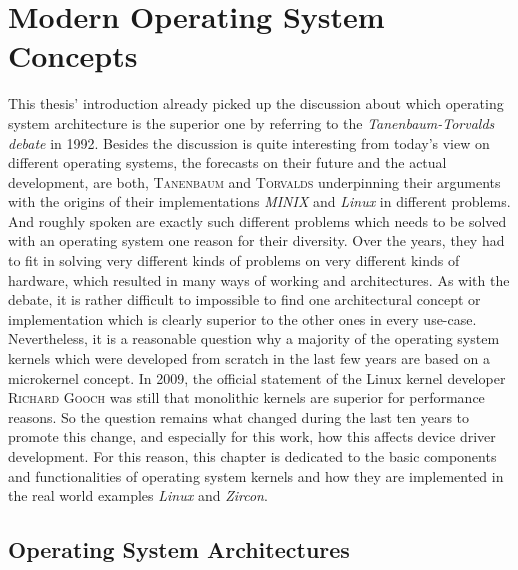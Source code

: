 
\chapter{Modern Operating System Concepts}\label{ch:modern-os-concepts}
This thesis' introduction already picked up the discussion about which operating system architecture is the superior one by referring to the \textit{Tanenbaum-Torvalds debate}\cite{linux-is-obsolete} in 1992.
Besides the discussion is quite interesting from today's view on different operating systems, the forecasts on their future and the actual development, are both, \textsc{Tanenbaum} and \textsc{Torvalds} underpinning their arguments with the origins of their implementations \textit{MINIX} and \textit{Linux} in different problems. 
And roughly spoken are exactly such different problems which needs to be solved with an operating system one reason for their diversity. 
Over the years, they had to fit in solving very different kinds of problems on very different kinds of hardware, which resulted in many ways of working and architectures. 
As with the debate, it is rather difficult to impossible to find one architectural concept or implementation which is clearly superior to the other ones in every use-case. 
Nevertheless, it is a reasonable question why a majority of the operating system kernels which were developed from scratch in the last few years are based on a microkernel concept.
In 2009, the official statement of the Linux kernel developer \textsc{Richard Gooch} was still that monolithic kernels are superior for performance reasons\cite{why-linux-monolith}.
So the question remains what changed during the last ten years to promote this change, and especially for this work, how this affects device driver development.
For this reason, this chapter is dedicated to the basic components and functionalities of operating system kernels and how they are implemented in the real world examples \textit{Linux} and \textit{Zircon}.

\section{Operating System Architectures}\label{sec:kernel-arch-concepts}

